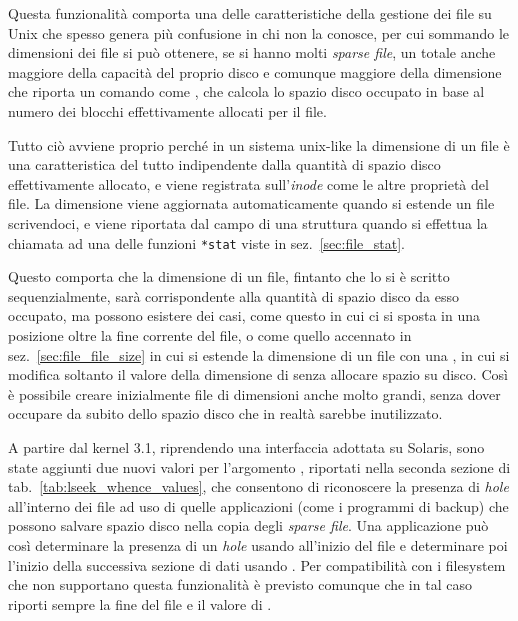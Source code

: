 Questa funzionalità comporta una delle caratteristiche della gestione dei file
su Unix che spesso genera più confusione in chi non la conosce, per cui
sommando le dimensioni dei file si può ottenere, se si hanno molti
\textit{sparse file}, un totale anche maggiore della capacità del proprio
disco e comunque maggiore della dimensione che riporta un comando come
, che calcola lo spazio disco occupato in base al numero dei blocchi
effettivamente allocati per il file.

Tutto ciò avviene proprio perché in un sistema unix-like la dimensione di un
file è una caratteristica del tutto indipendente dalla quantità di spazio
disco effettivamente allocato, e viene registrata sull'\textit{inode} come le
altre proprietà del file. La dimensione viene aggiornata automaticamente
quando si estende un file scrivendoci, e viene riportata dal campo
 di una struttura  quando si effettua la chiamata
ad una delle funzioni \texttt{*stat} viste in sez.~\ref{sec:file_stat}.

Questo comporta che la dimensione di un file, fintanto che lo si è scritto
sequenzialmente, sarà corrispondente alla quantità di spazio disco da esso
occupato, ma possono esistere dei casi, come questo in cui ci si sposta in una
posizione oltre la fine corrente del file, o come quello accennato in
sez.~\ref{sec:file_file_size} in cui si estende la dimensione di un file con
una , in cui si modifica soltanto il valore della dimensione di
 senza allocare spazio su disco. Così è possibile creare
inizialmente file di dimensioni anche molto grandi, senza dover occupare da
subito dello spazio disco che in realtà sarebbe inutilizzato.


A partire dal kernel 3.1, riprendendo una interfaccia adottata su Solaris,
sono state aggiunti due nuovi valori per l'argomento , riportati
nella seconda sezione di tab.~\ref{tab:lseek_whence_values}, che consentono di
riconoscere la presenza di \textit{hole} all'interno dei file ad uso di quelle
applicazioni (come i programmi di backup) che possono salvare spazio disco
nella copia degli \textit{sparse file}. Una applicazione può così determinare
la presenza di un \textit{hole} usando  all'inizio del file
e determinare poi l'inizio della successiva sezione di dati usando
. Per compatibilità con i filesystem che non supportano
questa funzionalità è previsto comunque che in tal caso 
riporti sempre la fine del file e  il valore
di .

